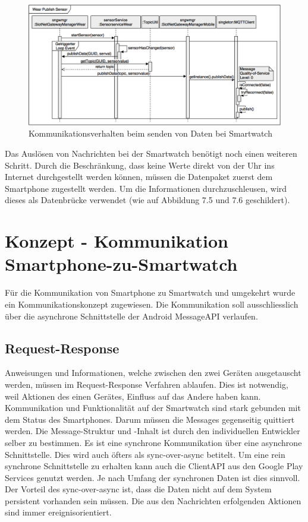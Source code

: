 \begin{figure}[H]
  \centering
  \includegraphics[scale=0.23]{98_Bilder/09_Konzept/02_SequenzdiagrammSensorstartSiotSensorcenter}
  \caption[siot.net Sensorcenter Sequenzdiagramm Sensor starten 2]{Kommunikationsverhalten beim senden von Daten bei Smartwatch}
\end{figure}
Das Auslösen von Nachrichten bei der Smartwatch benötigt noch einen weiteren Schritt. Durch die Beschränkung, dass keine Werte direkt von der Uhr ins Internet durchgestellt werden können, müssen die Datenpaket zuerst dem Smartphone zugestellt werden. Um die Informationen durchzuschleusen, wird dieses als Datenbrücke verwendet (wie auf Abbildung 7.5 und 7.6 geschildert).

\section{Konzept - Kommunikation Smartphone-zu-Smartwatch}
Für die Kommunikation von Smartphone zu Smartwatch und umgekehrt wurde ein Kommunikationskonzept zugewiesen. Die Kommunikation soll ausschliesslich über die asynchrone Schnittstelle der Android Message\gls{API} verlaufen.

\subsection{Request-Response}
Anweisungen und Informationen, welche zwischen den zwei Geräten ausgetauscht werden, müssen im Request-Response Verfahren ablaufen. Dies ist notwendig, weil Aktionen des einen Gerätes, Einfluss auf das Andere haben kann. Kommunikation und Funktionalität auf der Smartwatch sind stark gebunden mit dem Status des Smartphones. Darum müssen die Messages gegenseitig quittiert werden. Die Message-Struktur und -Inhalt ist durch den individuellen Entwickler selber zu bestimmen. Es ist eine synchrone Kommunikation über eine asynchrone Schnittstelle. Dies wird auch öfters als sync-over-async betitelt.
Um eine rein synchrone Schnittstelle zu erhalten kann auch die Client\gls{API} aus den Google Play Services genutzt werden. Je nach Umfang der synchronen Daten ist dies sinnvoll. Der Vorteil des sync-over-async ist, dass die Daten nicht auf dem System persistent vorhanden sein müssen. Die aus den Nachrichten erfolgenden Aktionen sind immer ereignisorientiert.

